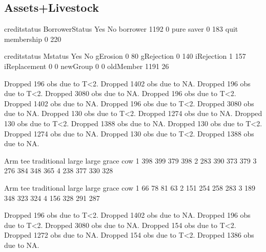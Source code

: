 \subsection{Assets+Livestock}




\begin{Schunk}
\begin{Soutput}
                 creditstatus
BorrowerStatus     Yes   No
  borrower        1192    0
  pure saver         0  183
  quit membership    0  220
\end{Soutput}
\begin{Soutput}
              creditstatus
Mstatus         Yes   No
  gErosion        0   80
  gRejection      0  140
  iRejection      1  157
  iReplacement    0    0
  newGroup        0    0
  oldMember    1191   26
\end{Soutput}
\begin{Soutput}
Dropped 196 obs due to T<2.
Dropped 1402 obs due to NA.
Dropped 196 obs due to T<2.
Dropped 3080 obs due to NA.
Dropped 196 obs due to T<2.
Dropped 1402 obs due to NA.
Dropped 196 obs due to T<2.
Dropped 3080 obs due to NA.
Dropped 130 obs due to T<2.
Dropped 1274 obs due to NA.
Dropped 130 obs due to T<2.
Dropped 1388 obs due to NA.
Dropped 130 obs due to T<2.
Dropped 1274 obs due to NA.
Dropped 130 obs due to T<2.
Dropped 1388 obs due to NA.
\end{Soutput}
\end{Schunk}

\begin{Schunk}
\begin{Soutput}
   Arm
tee traditional large large grace cow
  1         398   399         379 398
  2         283   390         373 379
  3         276   384         348 365
  4         238   377         330 328
\end{Soutput}
\begin{Soutput}
   Arm
tee traditional large large grace cow
  1          66    78          81  63
  2         151   254         258 283
  3         189   348         323 324
  4         156   328         291 287
\end{Soutput}
\begin{Soutput}
Dropped 196 obs due to T<2.
Dropped 1402 obs due to NA.
Dropped 196 obs due to T<2.
Dropped 3080 obs due to NA.
Dropped 154 obs due to T<2.
Dropped 1272 obs due to NA.
Dropped 154 obs due to T<2.
Dropped 1386 obs due to NA.
\end{Soutput}
\end{Schunk}

